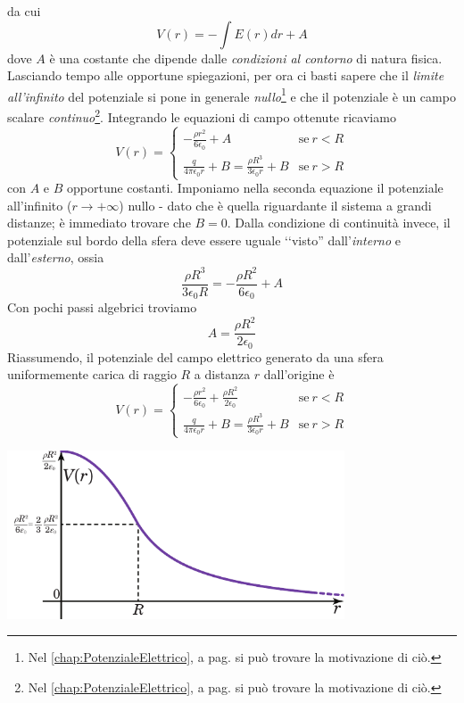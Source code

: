 da cui
\begin{equation*}
	V(r)=-\int E(r)dr+A
\end{equation*}
dove $A$ è una costante che dipende dalle \textit{condizioni al contorno} di natura fisica. Lasciando tempo alle opportune spiegazioni, per ora ci basti sapere che il \textit{limite all'infinito} del potenziale si pone in generale \textit{nullo}\footnote{Nel \autoref{chap:PotenzialeElettrico}, a pag. \pageref{CondizionialContornoPot} si può trovare la motivazione di ciò.} e che il potenziale è un campo scalare \textit{continuo}\footnote{Nel \autoref{chap:PotenzialeElettrico}, a pag. \pageref{PotenzialeContinuo} si può trovare la motivazione di ciò.}. Integrando le equazioni di campo ottenute ricaviamo
\begin{equation*}
	V(r)=\begin{cases}
		\displaystyle-\frac{\rho r^2}{6\epsilon_0} + A&\text{se}\ r< R\\
		\displaystyle\frac{q}{4\pi\epsilon_0 r} + B=\frac{\rho R^3}{3\epsilon_0r} + B&\text{se}\ r> R
	\end{cases}
\end{equation*}
con $A$ e $B$ opportune costanti. Imponiamo nella seconda equazione il potenziale all'infinito ($r\to+\infty$) nullo - dato che è quella riguardante il sistema a grandi distanze; è immediato trovare che $B=0$. Dalla condizione di continuità invece, il potenziale sul bordo della sfera deve essere uguale ‘‘visto'' dall'\textit{interno} e dall'\textit{esterno}, ossia
\begin{equation*}
	\frac{\rho R^3}{3\epsilon_0R}=-\frac{\rho R^2}{6\epsilon_0} + A
\end{equation*}
Con pochi passi algebrici troviamo
\begin{equation*}
	A=\frac{\rho R^2}{2\epsilon_0}
\end{equation*}
Riassumendo, il potenziale del campo elettrico generato da una sfera uniformemente carica di raggio $R$ a distanza $r$ dall'origine è
\begin{equation}
	V(r)=\begin{cases}
		\displaystyle-\frac{\rho r^2}{6\epsilon_0} + \frac{\rho R^2}{2\epsilon_0}&\text{se}\ r< R\\
		\displaystyle\frac{q}{4\pi\epsilon_0 r} + B=\frac{\rho R^3}{3\epsilon_0r} + B&\text{se}\ r> R
	\end{cases}
\end{equation}
\begin{center}
	\includegraphics[width=0.75\textwidth]{images/chp2/chp2sferagraf2.pdf}
\end{center}
